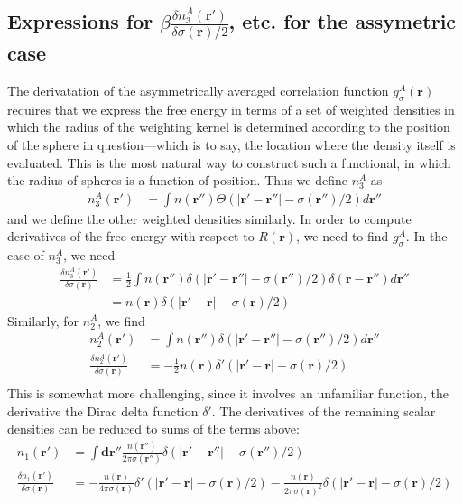 \documentclass[letterpaper,twocolumn,amsmath,amssymb,jcp,10pt,aip]{revtex4-1}
\newcommand{\rr}{\textbf{r}}
\begin{document}
\begin{widetext}
\subsection{Expressions for $\beta\frac{\delta n_3^{A}(\mathbf{r}')}{\delta \sigma(\mathbf{r})/2}$, etc. for the assymetric case}\label{appendix:g-A}

The derivatation of the asymmetrically averaged correlation function
$g_\sigma^A(\rr)$ requires that we express the free energy in terms of
a set of weighted densities in which the radius of the weighting
kernel is determined according to the position of the sphere in
question---which is to say, the location where the density itself is
evaluated.  This is the most natural way to construct such a
functional, in which the radius of spheres is a function of position.
Thus we define $n_3^A$ as
\begin{align}
  n_3^{A}(\rr') &= \int n(\rr'') \Theta(\left|\rr' - \rr''\right| -\sigma(\rr'')/2) d\rr''
\end{align}
and we define the other weighted densities similarly.  In order to
compute derivatives of the free energy with respect to $R(\rr)$, we
need to find $g_\sigma^A$.  In the case of $n_3^A$, we need
\begin{align}
  \frac{\delta n_3^{A} (\rr')}{\delta \sigma(\rr)} &=
  \frac 12 \int n (\rr'') \delta(|\rr' - \rr''| - \sigma(\rr'')/2) \delta(\rr-\rr'') d\rr'' \\
   &= n (\rr) \delta(|\rr' - \rr| - \sigma(\rr)/2)
\end{align}
Similarly, for $n_2^A$, we find
\begin{align}
  n_2^{A}(\rr') &= \int n(\rr'') \delta(|\rr' - \rr''| - \sigma(\rr'')/2) d \rr''\\
  \frac{\delta n_2^{A}(\rr')}{\delta \sigma(\rr)} &= -\frac 12 n(\rr) \delta'(|\rr' - \rr| - \sigma(\rr)/2)\\
\end{align}
This is somewhat more challenging, since it involves an unfamiliar
function, the derivative the Dirac delta function $\delta'$.
%
The derivatives of the remaining scalar densities can be reduced to
sums of the terms above:
\begin{align}
  n_1(\rr') &= \int \mathbf{dr''} \frac{n(\rr'')}{2\pi \sigma(\rr'')}
  \delta(|\rr'-\rr''| - \sigma(\rr'')/2) \\
  \frac{\delta n_1(\rr')}{\delta \sigma(\rr)}
  &= -\frac{n(\rr)}{4\pi
    \sigma(\rr)}\delta'(|\rr'-\rr| - \sigma(\rr)/2)
  -
  \frac{n(\rr)}{2\pi
    \sigma(\rr)^2}\delta(|\rr'-\rr| - \sigma(\rr)/2)

\end{align}
\end{widetext}
\end{document}
